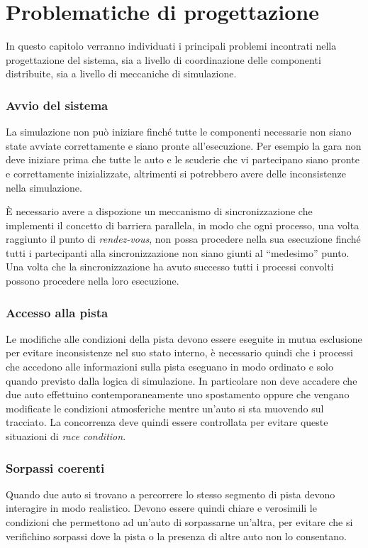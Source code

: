 \chapter{Problematiche di progettazione}

In questo capitolo verranno individuati i principali problemi incontrati nella progettazione del sistema, sia a livello di coordinazione delle componenti distribuite, sia a livello di meccaniche di simulazione.

\subsection*{Avvio del sistema}
La simulazione non può iniziare finché tutte le componenti necessarie non siano state avviate correttamente e siano pronte all'esecuzione. Per esempio la gara non deve iniziare prima che tutte le auto e le scuderie che vi partecipano siano pronte e correttamente inizializzate, altrimenti si potrebbero avere delle inconsistenze nella simulazione.

\`E necessario avere a dispozione un meccanismo di sincronizzazione che implementi il concetto di barriera parallela, in modo che ogni processo, una volta raggiunto il punto di \textsl{rendez-vous}, non possa procedere nella sua esecuzione finché tutti i partecipanti alla sincronizzazione non siano giunti al ``medesimo'' punto. Una volta che la sincronizzazione ha avuto successo tutti i processi convolti possono procedere nella loro esecuzione.


\subsection*{Accesso alla pista}
Le modifiche alle condizioni della pista devono essere eseguite in mutua esclusione per evitare inconsistenze nel suo stato interno, è necessario quindi che i processi che accedono alle informazioni sulla pista eseguano in modo ordinato e solo quando previsto dalla logica di simulazione. In particolare non deve accadere che due auto effettuino contemporaneamente uno spostamento oppure che vengano modificate le condizioni atmosferiche mentre un'auto si sta muovendo sul tracciato.
La concorrenza deve quindi essere controllata per evitare queste situazioni di \textit{race condition}.

\subsection*{Sorpassi coerenti}
Quando due auto si trovano a percorrere lo stesso segmento di pista devono interagire in modo realistico. Devono essere quindi chiare e verosimili le condizioni che permettono ad un'auto di sorpassarne un'altra, per evitare che si verifichino sorpassi dove la pista o la presenza di altre auto non lo consentano.

